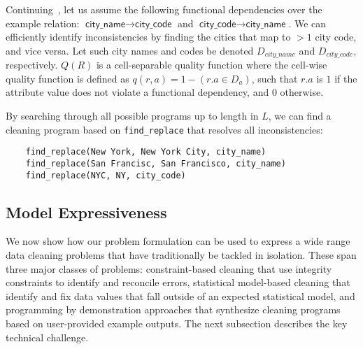 \begin{example}\label{ex3}
Continuing~, let us assume the following functional dependencies over the example relation: $\textsf{city\_name} \rightarrow \textsf{city\_code}$ and $\textsf{city\_code} \rightarrow \textsf{city\_name}$.
We can efficiently identify inconsistencies by finding the cities that map to $>1$ city code, and vice versa.   Let such city names and codes be denoted $D_{city\_name}$ and $D_{city\_code}$, respectively.
$Q(R)$ is a cell-separable quality function where the cell-wise quality function is defined as $q(r, a) = 1 - (r.a \in D_a)$, such that $r.a$ is $1$ if the attribute value does not violate a functional dependency, and $0$ otherwise.

By searching through all possible programs up to length  in $L$, we can find a cleaning program based on \texttt{find\_replace} that resolves all inconsistencies:
\begin{lstlisting}
    find_replace(New York, New York City, city_name)
    find_replace(San Francisc, San Francisco, city_name)
    find_replace(NYC, NY, city_code)
\end{lstlisting}
\end{example}







\subsection{Model Expressiveness}
We now show how our problem formulation can be used to express a wide range data cleaning problems that have traditionally be tackled in isolation.  These span three major classes of problems: constraint-based cleaning that use integrity constraints to identify and reconcile errors, statistical model-based  cleaning that identify and fix data values that fall outside of an expected statistical model, and programming by demonstration approaches that synthesize cleaning programs based on user-provided example outputs.   The next subsection describes the key technical challenge.


